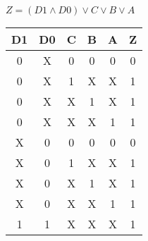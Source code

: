 
\begin{center}
    {\(Z = (D1 \land D0) \lor C \lor B \lor A \)}
    \begin{table}[h] %
        \begin{center}
            \begin{tabular}{|c|c|c|c|c||c|} \hline
            D1 & D0 & C & B & A & Z \\ \hline\hline
            0  & X  & 0 & 0 & 0 & 0 \\ \hline
            0  & X  & 1 & X & X & 1 \\ \hline
            0  & X  & X & 1 & X & 1 \\ \hline
            0  & X  & X & X & 1 & 1 \\ \hline
            X  & 0  & 0 & 0 & 0 & 0 \\ \hline
            X  & 0  & 1 & X & X & 1 \\ \hline
            X  & 0  & X & 1 & X & 1 \\ \hline
            X  & 0  & X & X & 1 & 1 \\ \hline
            1  & 1  & X & X & X & 1 \\ \hline
            \end{tabular}
        \end{center}
    \end{table}
\end{center}
